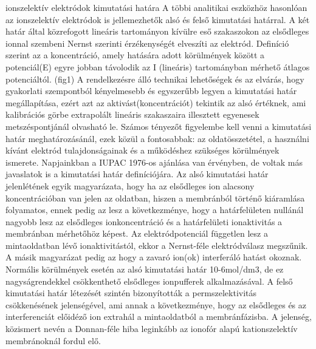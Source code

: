 {\subsectionAz ionszelektív elektródok kimutatási határa
A többi analitikai eszközhöz hasonlóan az ionszelektív elektródok is jellemezhetők alsó és felső kimutatási határral. A két határ által közrefogott lineáris tartományon kívülre eső szakaszokon az elsődleges ionnal szembeni Nernst szerinti érzékenységét elveszíti az elektród.  Definíció szerint az a koncentráció, amely hatására adott körülmények között a potenciál(E) egyre jobban távolodik az I (lineáris) tartományban mérhető átlagos potenciáltól. (fig1) A rendelkezésre álló technikai lehetőségek és az elvárás, hogy gyakorlati szempontból kényelmesebb és egyszerűbb legyen a kimutatási határ megállapítása, ezért azt az aktivást(koncentrációt) tekintik az alsó értéknek, ami kalibrációs görbe extrapolált lineáris szakaszaira illesztett egyenesek metszéspontjánál olvasható le. Számos tényezőt figyelembe kell venni a kimutatási határ meghatározásánál, ezek közül a fontosabbak: az oldatösszetétel, a használni kívánt elektród tulajdonságainak és a működéshez szükséges körülmények ismerete. 
 Napjainkban a IUPAC 1976-os ajánlása van érvényben, de voltak más javaslatok is a kimutatási határ definíciójára. 
Az alsó kimutatási határ jelenlétének egyik magyarázata, hogy ha az elsődleges ion alacsony koncentrációban van jelen az oldatban, hiszen a membránból történő kiáramlása folyamatos, ennek pedig az lesz a következménye, hogy a határfelületen nullánál nagyobb lesz az elsődleges ionkoncentráció és a határfelületi ionaktivitás a membránban mérhetőhöz képest. Az elektródpotenciál független lesz a mintaoldatban lévő ionaktivitástól, ekkor a Nernst-féle elektródválasz megszűnik. A másik magyarázat pedig az hogy a zavaró ion(ok) interferáló hatást okoznak. Normális körülmények esetén az alsó kimutatási határ 10-6mol/dm3, de ez nagyságrendekkel csökkenthető elsődleges ionpufferek alkalmazásával.
A felső kimutatási határ létezését szintén bizonyították a permszelektivitás csökkenésének jelenségével, ami annak a következménye, hogy az elsődleges és az interferenciát előidéző ion extrahál a mintaoldatból a membránfázisba. A jelenség, közismert nevén a Donnan-féle hiba leginkább az ionofór alapú kationszelektív membránoknál fordul elő. 

}
